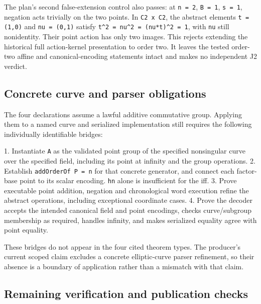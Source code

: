 \documentclass[10pt]{article}
\begin{document}
The plan's second false-extension control also passes: at \texttt{n = 2}, \texttt{B = 1}, \texttt{s = 1}, negation acts trivially on the two points. In \texttt{C2 x C2}, the abstract elements \texttt{t = (1,0)} and \texttt{nu = (0,1)} satisfy \texttt{t\textasciicircum{}2 = nu\textasciicircum{}2 = (nu*t)\textasciicircum{}2 = 1}, with \texttt{nu} still nonidentity. Their point action has only two images. This rejects extending the historical full action-kernel presentation to order two. It leaves the tested order-two affine and canonical-encoding statements intact and makes no independent J2 verdict.


\subsection*{Concrete curve and parser obligations}


The four declarations assume a lawful additive commutative group. Applying them to a named curve and serialized implementation still requires the following individually identifiable bridges:


1. Instantiate \texttt{A} as the validated point group of the specified nonsingular curve over the specified field, including its point at infinity and the group operations.
2. Establish \texttt{addOrderOf P = n} for that concrete generator, and connect each factor-base point to its scalar encoding. \texttt{hn} alone is insufficient for the iff.
3. Prove executable point addition, negation and chronological word execution refine the abstract operations, including exceptional coordinate cases.
4. Prove the decoder accepts the intended canonical field and point encodings, checks curve/subgroup membership as required, handles infinity, and makes serialized equality agree with point equality.


These bridges do not appear in the four cited theorem types. The producer's current scoped claim excludes a concrete elliptic-curve parser refinement, so their absence is a boundary of application rather than a mismatch with that claim.


\subsection*{Remaining verification and publication checks}
\end{document}
